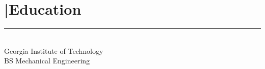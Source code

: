 \section{\textcolor{gold}{\faGraduationCap}|Education} 
\noindent\color{blue}\rule{5.5cm}{0.4pt}\\
Georgia Institute of Technology \\
BS Mechanical Engineering \\
\sectionsep